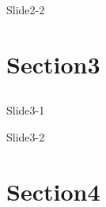 \documentclass[t, 11pt]{beamer}
\newcommand{\placetextbox}[4][center]{%
  \tikz[remember picture,overlay,x=\paperwidth,y=\paperheight]{%
    \node[anchor=#1,inner sep=0pt]
    at ($(current page.south west)+(#2,#3)$) {#4};
  }%
}
\begin{document}
\begin{frame}[fragile]{Slide2-2}
\end{frame}

\section{Section3}
\subsection*{}
\begin{frame}[fragile]{Slide3-1}
\end{frame}

\begin{frame}[fragile]{Slide3-2}
\end{frame}


\section{Section4}
\end{document}
